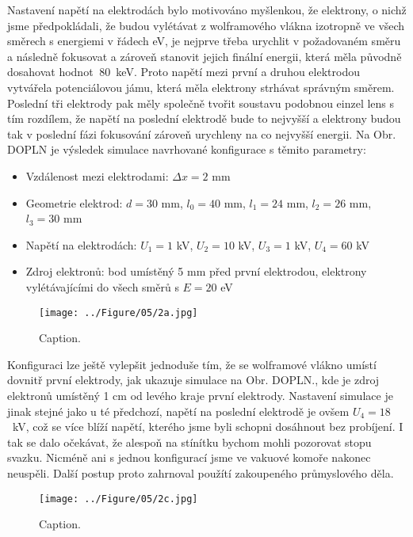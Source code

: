 Nastavení napětí na elektrodách bylo motivováno myšlenkou, že elektrony, o nichž jsme předpokládali, že budou vylétávat z wolframového vlákna izotropně ve všech směrech s energiemi v řádech eV, je nejprve třeba urychlit v požadovaném směru a následně fokusovat a zároveň stanovit jejich finální energii, která měla původně dosahovat hodnot $~80$~keV. Proto napětí mezi první a druhou elektrodou vytvářela potenciálovou jámu, která měla elektrony strhávat správným směrem. Poslední tři elektrody pak měly společně tvořit soustavu podobnou einzel lens s tím rozdílem, že napětí na poslední elektrodě bude to nejvyšší a elektrony budou tak v poslední fázi fokusování zároveň urychleny na co nejvyšší energii. Na Obr. DOPLN je výsledek simulace navrhované konfigurace s těmito parametry:
\begin{itemize}
	\item Vzdálenost mezi elektrodami: $\Delta x = 2$ mm
	\item Geometrie elektrod: $d = 30$ mm, $l_0 = 40$ mm, $l_1 = 24$ mm, $l_2 = 26$ mm, $l_3 = 30$ mm
	\item Napětí na elektrodách: $U_1 = 1$ kV, $U_2 = 10$ kV, $U_3 = 1$ kV, $U_4 = 60$ kV
	\item Zdroj elektronů: bod umístěný 5 mm před první elektrodou, elektrony vylétávajícími do všech směrů s $E = 20$ eV
\end{itemize}

\begin{figure}[htbp!]
\centering
\texttt{[image: ../Figure/05/2a.jpg]}
\caption{Caption.}
\label{05simulaceVlastniDelo}
\end{figure}

Konfiguraci lze ještě vylepšit jednoduše tím, že se wolframové vlákno umístí dovnitř první elektrody, jak ukazuje simulace na Obr. DOPLN., kde je zdroj elektronů umístěný 1 cm od levého kraje první elektrody. Nastavení simulace je jinak stejné jako u té předchozí, napětí na poslední elektrodě je ovšem $U_4 = 18$~kV, což se více blíží napětí, kterého jsme byli schopni dosáhnout bez probíjení. I tak se dalo očekávat, že alespoň na stínítku bychom mohli pozorovat stopu svazku. Nicméně ani s jednou konfigurací jsme ve vakuové komoře nakonec neuspěli. Další postup proto zahrnoval použítí zakoupeného průmyslového děla.\\

\begin{figure}[htbp!]
\centering
\texttt{[image: ../Figure/05/2c.jpg]}
\caption{Caption.}
\label{05simulaceVlastniDeloWehnelt}
\end{figure}

